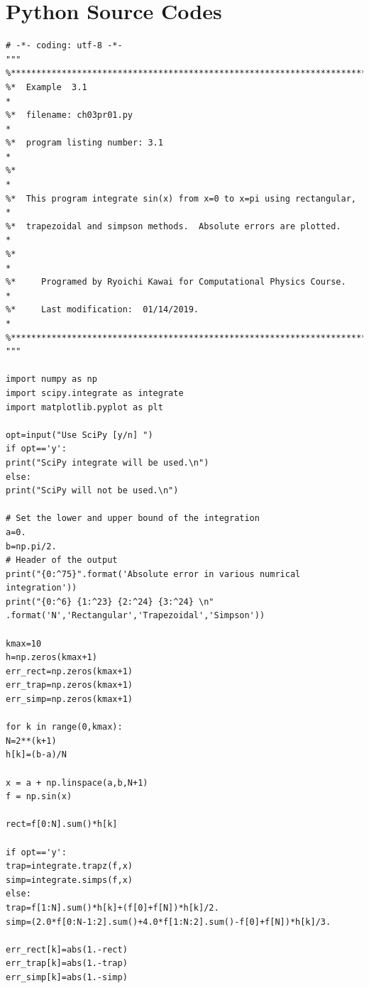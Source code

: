 \newpage
\normalsize
\noindent
\section*{Python Source Codes}
\setcounter{program}{0}

\bigskip\noindent
\program
\label{python:integrals}
\footnotesize
\begin{verbatim}
# -*- coding: utf-8 -*-
"""
%**************************************************************************
%*  Example  3.1                                                          *
%*  filename: ch03pr01.py                                                 *
%*  program listing number: 3.1                                           *
%*                                                                        *
%*  This program integrate sin(x) from x=0 to x=pi using rectangular,     *
%*  trapezoidal and simpson methods.  Absolute errors are plotted.        *
%*                                                                        *
%*     Programed by Ryoichi Kawai for Computational Physics Course.       *
%*     Last modification:  01/14/2019.                                    *
%**************************************************************************
"""

import numpy as np
import scipy.integrate as integrate
import matplotlib.pyplot as plt

opt=input("Use SciPy [y/n] ")
if opt=='y':
print("SciPy integrate will be used.\n")
else:
print("SciPy will not be used.\n")

# Set the lower and upper bound of the integration
a=0.
b=np.pi/2.
# Header of the output
print("{0:^75}".format('Absolute error in various numrical integration'))
print("{0:^6} {1:^23} {2:^24} {3:^24} \n"
.format('N','Rectangular','Trapezoidal','Simpson'))

kmax=10
h=np.zeros(kmax+1)
err_rect=np.zeros(kmax+1)
err_trap=np.zeros(kmax+1)
err_simp=np.zeros(kmax+1)

for k in range(0,kmax):
N=2**(k+1)
h[k]=(b-a)/N

x = a + np.linspace(a,b,N+1)
f = np.sin(x)

rect=f[0:N].sum()*h[k]

if opt=='y':
trap=integrate.trapz(f,x)
simp=integrate.simps(f,x)
else:      
trap=f[1:N].sum()*h[k]+(f[0]+f[N])*h[k]/2.    
simp=(2.0*f[0:N-1:2].sum()+4.0*f[1:N:2].sum()-f[0]+f[N])*h[k]/3. 

err_rect[k]=abs(1.-rect)
err_trap[k]=abs(1.-trap)
err_simp[k]=abs(1.-simp)


\end{verbatim}
